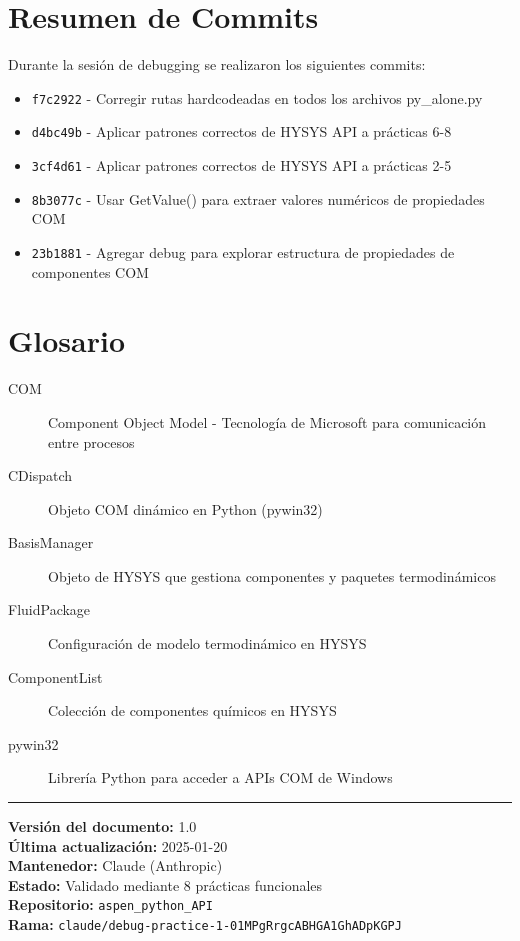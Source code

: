 \documentclass[12pt,a4paper]{article}
\begin{document}
\appendix

\section{Resumen de Commits}

Durante la sesión de debugging se realizaron los siguientes commits:

\begin{itemize}
    \item \texttt{f7c2922} - Corregir rutas hardcodeadas en todos los archivos py\_alone.py
    \item \texttt{d4bc49b} - Aplicar patrones correctos de HYSYS API a prácticas 6-8
    \item \texttt{3cf4d61} - Aplicar patrones correctos de HYSYS API a prácticas 2-5
    \item \texttt{8b3077c} - Usar GetValue() para extraer valores numéricos de propiedades COM
    \item \texttt{23b1881} - Agregar debug para explorar estructura de propiedades de componentes COM
\end{itemize}

\section{Glosario}

\begin{description}
    \item[COM] Component Object Model - Tecnología de Microsoft para comunicación entre procesos
    \item[CDispatch] Objeto COM dinámico en Python (pywin32)
    \item[BasisManager] Objeto de HYSYS que gestiona componentes y paquetes termodinámicos
    \item[FluidPackage] Configuración de modelo termodinámico en HYSYS
    \item[ComponentList] Colección de componentes químicos en HYSYS
    \item[pywin32] Librería Python para acceder a APIs COM de Windows
\end{description}

\vfill
\hrule
\vspace{0.5cm}
\noindent
\textbf{Versión del documento:} 1.0 \\
\textbf{Última actualización:} 2025-01-20 \\
\textbf{Mantenedor:} Claude (Anthropic) \\
\textbf{Estado:} Validado mediante 8 prácticas funcionales \\
\textbf{Repositorio:} \texttt{aspen\_python\_API} \\
\textbf{Rama:} \texttt{claude/debug-practice-1-01MPgRrgcABHGA1GhADpKGPJ}
\end{document}
